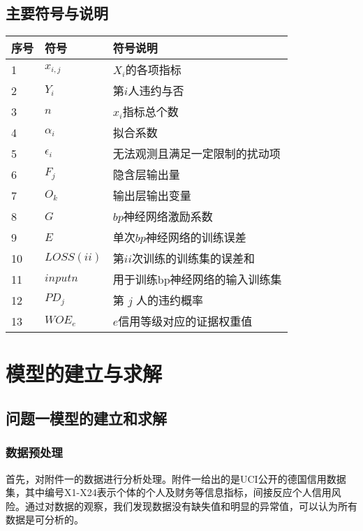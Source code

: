 \documentclass[12pt,a4paper]{nmmcm}
\newcommand{\headcol}{\rowcolor{tableheadcolor}}
\begin{document}
\subsection{主要符号与说明}
\begin{table}[h]
  \centering
  \small
  \begin{tabular}{p{60pt}<{\centering}|p{60pt}<{\centering}p{180pt}<{\raggedright}}
   \hline
   \headcol 序号 & 符号 & 符号说明 \\
   \hline
    1 & $x_{i,j}$ & $X_{i}$的各项指标 \\
    2 & $Y_{i}$ & 第$i$人违约与否\\
    3 & $n$ & $x_{i}$指标总个数 \\
    4 & $\alpha_{i}$ & 拟合系数 \\
    5 & $\epsilon_{i}$ & 无法观测且满足一定限制的扰动项\\
    6 & $F_{j}$ & 隐含层输出量 \\
    7 & $O_{k}$ & 输出层输出变量\\
    8 & $G$ & $bp$神经网络激励系数\\
    9 & $E$ & 单次$bp$神经网络的训练误差 \\
    10 & $LOSS(ii)$ & 第$ii$次训练的训练集的误差和\\
    11 & $inputn$ &  用于训练bp神经网络的输入训练集\\
    12 &$PD_{j}$& 第 $j$ 人的违约概率\\
    13 &$WOE_{e}$ & $e$信用等级对应的证据权重值\\
    \hline
  \end{tabular}
  \label{symbol}
\end{table}


\section{模型的建立与求解}
\subsection{问题一模型的建立和求解}
\subsubsection{数据预处理}
首先，对附件一的数据进行分析处理。附件一给出的是UCI公开的德国信用数据集，其中编号X1-X24表示个体的个人及财务等信息指标，间接反应个人信用风险。通过对数据的观察，我们发现数据没有缺失值和明显的异常值，可以认为所有数据是可分析的。
\end{document}
